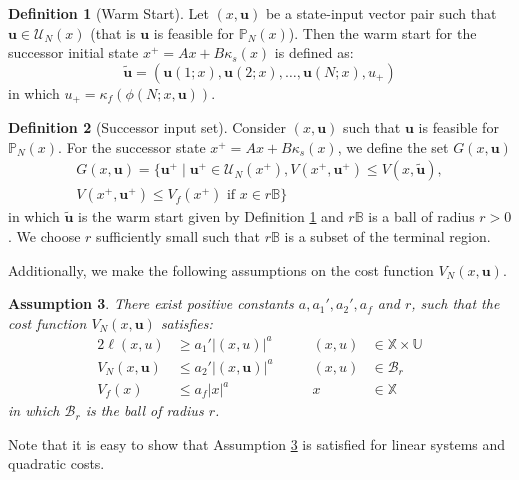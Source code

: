 \documentclass[10pt]{article}
\newcommand{\bu}{\mathbf{u}}
\newcommand{\norm}[1]{\vert #1 \vert}
\newtheorem{assumption}{Assumption}
\theoremstyle{definition}
\newtheorem{definition}[assumption]{Definition}
\begin{document}
\begin{definition}[Warm Start]
\label{def:warmstart}
Let $(x,\bu)$ be a state-input vector pair such that $\bu \in \mathcal{U}_N(x)$ (that is $\bu$ is feasible
for $\mathbb{P}_N(x)$).  Then the warm start for the successor initial state
$x^+ = Ax+B\kappa_s(x)$ is defined as:
\begin{equation*}
\tilde{\bu} = \left (\bu(1;x),\bu(2;x),\ldots,\bu(N;x),u_+\right)
\end{equation*}
in which  $u_+ = \kappa_f(\phi(N;x,\bu))$.
\end{definition}
\begin{definition}[Successor input set]
\label{def:G}
Consider $(x,\bu)$ such that $\bu$ is feasible for
$\mathbb{P}_N(x)$. For the  successor state 
$x^+ = Ax+B\kappa_s(x)$, we define the set $G(x,\bu)$
\begin{multline*}
G(x,\bu) = \lbrace \bu^+ \mid \bu^+ \in
\mathcal{U}_N(x^+), V(x^+,\bu^+)\leq V(x,\tilde{\bu}), \\
V(x^+,\bu^+) \leq V_f(x^+) \text{~if~} x\in r\mathbb{B} \rbrace
\end{multline*}
in which $\tilde{\bu}$ is the warm start given by Definition 
\ref{def:warmstart} and $r\mathbb{B}$ is a ball of radius $r>0$. We
choose $r$ sufficiently small such that  
$r\mathbb{B}$ is a subset of the terminal region.
\end{definition}
Additionally, we make the 
following assumptions on the cost function $V_N(x,\bu)$.

\begin{assumption}
\label{ass:mpc:suboptimalconstants}
There exist positive constants $a,a_1',a_2',a_f$ and $r$, such
that the cost function $V_N(x,\bu)$ satisfies:
\begin{alignat*}{2}
\ell(x,u) &\geq a_1' \norm{(x,u)}^a &\qquad (x,u) &\in \mathbb{X} \times \mathbb{U} \\
V_N(x,\bu) &\leq a_2' \norm{(x,\bu)}^a &\qquad (x,u) &\in
\mathcal{B}_{r} \\
V_f(x) &\leq a_f\norm{x}^a &\qquad x &\in \mathbb{X}
\end{alignat*}
in which $\mathcal{B}_{r}$ is the ball of radius $r$.
\end{assumption}

Note that it is easy to show that Assumption
\ref{ass:mpc:suboptimalconstants} is satisfied for linear systems and
quadratic costs.
\end{document}
